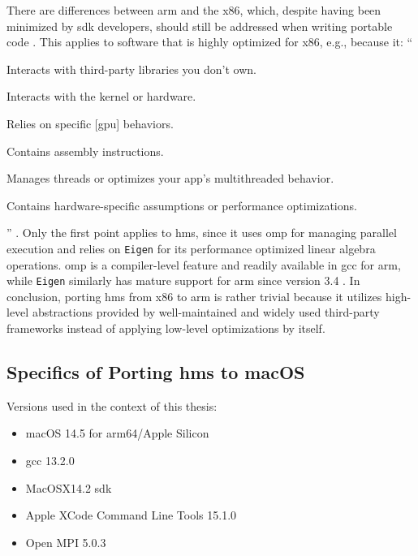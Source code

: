 There are differences between \gls{arm} and the \gls{x86}, which, despite having been minimized by \gls{sdk} developers, should still be addressed when writing portable code \autocite{apple-archdiff,apple-arm64code}.
This applies to software that is highly optimized for \gls{x86}, e.g., because it:
``\begin{enumerate*}[label=(\roman*)]
	\item Interacts with third-party libraries you don't own.
	\item Interacts with the kernel or hardware.
	\item Relies on specific [\gls{gpu}] behaviors.
	\item Contains assembly instructions.
	\item Manages threads or optimizes your app's multithreaded behavior.
	\item Contains hardware-specific assumptions or performance optimizations.
\end{enumerate*}'' \autocite{apple-porting}.
Only the first point applies to \gls{hms}, since it uses \gls{omp} for managing parallel execution and relies on \texttt{Eigen} for its performance optimized linear algebra operations.
\gls{omp} is a compiler-level feature and readily available in \gls{gcc} for \gls{arm}, while \texttt{Eigen} similarly has mature support for \gls{arm} since version 3.4 \autocite{eigen2021}.
In conclusion, porting \gls{hms} from \gls{x86} to \gls{arm} is rather trivial because it utilizes high-level abstractions provided by well-maintained and widely used third-party frameworks instead of applying low-level optimizations by itself.


\subsection*{Specifics of Porting \gls{hms} to macOS}\label{sec:porting-steps}

Versions used in the context of this thesis:
\begin{itemize}
  \item macOS 14.5 for arm64/Apple Silicon
  \item \gls{gcc} 13.2.0
  \item MacOSX14.2 \gls{sdk} 
  \item Apple XCode Command Line Tools 15.1.0
  \item Open MPI 5.0.3
\end{itemize}

